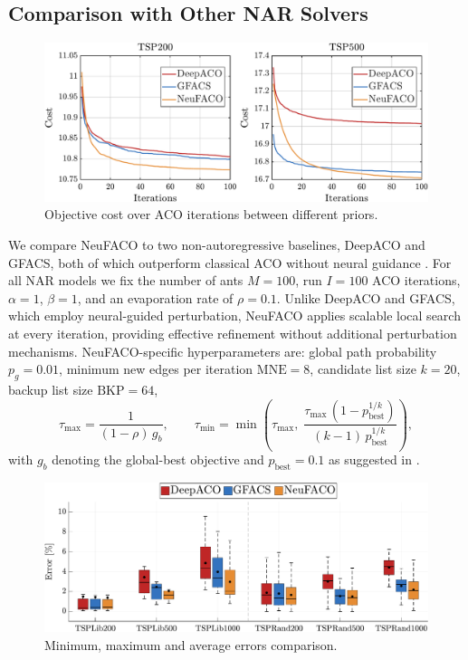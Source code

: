 \documentclass[a4paper,conference]{IEEEtran}
\begin{document}
\subsection{Comparison with Other NAR Solvers}

\begin{figure}[htbp]
  \centering
  \includegraphics[width=\linewidth]{TSP200_vs_TSP500_3lines.pdf}
  \caption{Objective cost over ACO iterations between different priors.}
  \label{fig:over_iterations}
\end{figure}

We compare NeuFACO to two non-autoregressive baselines, DeepACO and GFACS, both of which outperform classical ACO without neural guidance \cite{DeepACO,GFACS}. For all NAR models we fix the number of ants $M=100$, run $I=100$ ACO iterations, $\alpha = 1$, $\beta = 1$, and an evaporation rate of $\rho=0.1$. Unlike DeepACO and GFACS, which employ neural-guided perturbation, NeuFACO applies scalable local search at every iteration, providing effective refinement without additional perturbation mechanisms. NeuFACO-specific hyperparameters are: global path probability $p_g=0.01$, minimum new edges per iteration $\mathrm{MNE}=8$, candidate list size $k=20$, backup list size $\mathrm{BKP}=64$,
$$
\tau_{\max}=\frac{1}{(1-\rho)\,g_b},
\qquad
\tau_{\min}=\min\!\left(\tau_{\max},\;\frac{\tau_{\max}\,(1-p_{\text{best}}^{1/k})}{(k-1)\,p_{\text{best}}^{1/k}}\right),
$$
with $g_b$ denoting the global-best objective and $p_{\text{best}}=0.1$ as suggested in \cite{FACO2023}.



\begin{figure}[h]
  \centering
  \includegraphics[width=\linewidth]{TSPOverview.pdf}
  \caption{Minimum, maximum and average errors comparison.}
  \label{fig:candle}
\end{figure}
\end{document}
